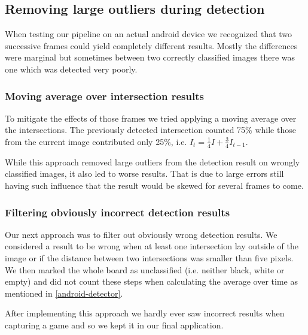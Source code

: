 	\subsection{Removing large outliers during detection}
	\label{evaluation-prepostprocessing-filteringOutliers}
	When testing our pipeline on an actual android device we recognized that two successive frames could yield completely different results. Mostly the differences were marginal but sometimes between two correctly classified images there was one which was detected very poorly.

	\subsubsection{Moving average over intersection results}
	\label{evaluation-prepostprocessing-filteringOutliers-movingAverage}
	To mitigate the effects of those frames we tried applying a moving average over the intersections. The previously detected intersection counted 75\% while those from the current image contributed only 25\%, i.e. $I_t = \frac{1}{4}I + \frac{3}{4}I_{t-1}$.

	While this approach removed large outliers from the detection result on wrongly classified images, it also led to worse results. That is due to large errors still having such influence that the result would be skewed for several frames to come.

	\subsubsection{Filtering obviously incorrect detection results}
	\label{evaluation-prepostprocessing-filteringOutliers-filteringWrong}
	Our next approach was to filter out obviously wrong detection results. We considered a result to be wrong when at least one intersection lay outside of the image or if the distance between two intersections was smaller than five pixels. We then marked the whole board as unclassified (i.e. neither black, white or empty) and did not count these steps when calculating the average over time as mentioned in \autoref{android-detector}.

	After implementing this approach we hardly ever saw incorrect results when capturing a game and so we kept it in our final application.






